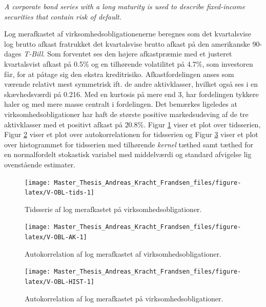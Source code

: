 \documentclass[
  a4paper,
  oneside]{memoir}
\begin{document}
\begin{center}
\textit{A corporate bond series with a long maturity is used to describe fixed-income securities that contain risk of default.}
\end{center}

Log merafkastet af virksomhedsobligationenerne beregnes som det kvartalsvise log brutto afkast fratrukket det kvartalsvise brutto afkast på den amerikanske 90-dages \emph{T-Bill}. Som forventet ses den højere afkastpræmie med et justeret kvartalsvist afkast på 0.5\(\%\) og en tilhørende volatilitet på 4.7\(\%\), som investoren får, for at påtage sig den ekstra kreditrisiko. Afkastfordelingen anses som værende relativt mest symmetrisk ift. de andre aktivklasser, hvilket også ses i en skævhedsværdi på 0.216. Med en kurtosis på mere end \(3\), har fordelingen tykkere haler og med mere masse centralt i fordelingen. Det bemærkes ligeledes at virksomhedsobligationer har haft de største positive markedsudsving af de tre aktivklasser med et positivt afkast på \(20.8 \%\). Figur \ref{fig:V-OBL-tids} viser et plot over tidsserien, Figur \ref{fig:V-OBL-AK} viser et plot over autokorrelationen for tidsserien og Figur \ref{fig:V-OBL-HIST} viser et plot over histogrammet for tidsserien med tilhørende \emph{kernel} tæthed samt tæthed for en normalfordelt stokastisk variabel med middelværdi og standard afvigelse lig ovenstående estimater.

\begin{figure}[htbp!]

{\centering \texttt{[image: Master\_Thesis\_Andreas\_Kracht\_Frandsen\_files/figure-latex/V-OBL-tids-1]} 

}

\caption{Tidsserie af log merafkastet på virksomhedsobligationer.}\label{fig:V-OBL-tids}
\end{figure}

\begin{figure}[htbp!]

{\centering \texttt{[image: Master\_Thesis\_Andreas\_Kracht\_Frandsen\_files/figure-latex/V-OBL-AK-1]} 

}

\caption{Autokorrelation af log merafkastet af virksomhedsobligationer.}\label{fig:V-OBL-AK}
\end{figure}

\begin{figure}[htbp!]

{\centering \texttt{[image: Master\_Thesis\_Andreas\_Kracht\_Frandsen\_files/figure-latex/V-OBL-HIST-1]} 

}

\caption{Autokorrelation af log merafkastet på virksomhedsobligationer.}\label{fig:V-OBL-HIST}
\end{figure}
\end{document}
